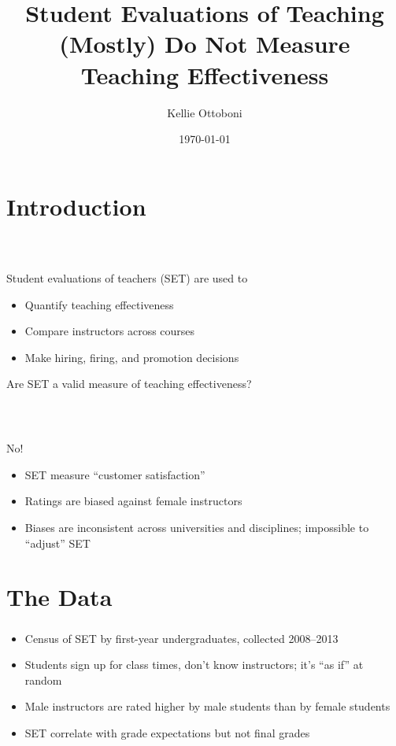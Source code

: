 \documentclass{beamer}
\title[SET]{Student Evaluations of Teaching (Mostly) Do Not Measure Teaching Effectiveness}
\author{Kellie Ottoboni}
\institute[]{Department of Statistics, UC Berkeley \\ Berkeley Institute for Data Science}
\date{\today}
\begin{document}
\frame{\titlepage}

\section{Introduction}
\frame
{
  \frametitle{ ~}
 \begin{center}
 \Large{ Student evaluations of teachers (SET) are used to} \\
  \begin{itemize}
  \item Quantify teaching effectiveness
  \item Compare instructors across courses
  \item Make hiring, firing, and promotion decisions  
  \end{itemize}
  \vfill
Are SET a valid measure of teaching effectiveness?
\end{center}
}

\frame
{
  \frametitle{ ~}
  \begin{center}
  \Huge{No!}
\vfill
\Large
  \begin{itemize}
  \item SET measure ``customer satisfaction''
  \item Ratings are biased against female instructors
  \item Biases are inconsistent across universities and disciplines; impossible to ``adjust'' SET
  \end{itemize}
  \end{center}
}

\section{The Data}
\frame
{
  \frametitle{\cite{Boring2015}}
  \Large
\begin{itemize}
\item Census of SET by first-year undergraduates, collected 2008--2013
\item Students sign up for class times, don't know instructors; it's ``as if'' at random
\item Male instructors are rated higher by male students than by female students
\item SET correlate with grade expectations but not final grades
\end{itemize}
}
\end{document}

